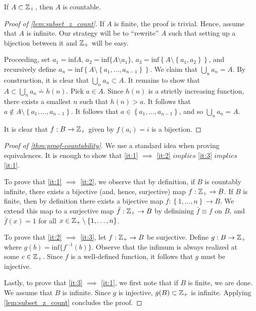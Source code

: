 \begin{lemma}\label{lem:subset_z_count}
	If $A \subset \mathbb{Z}_{+}$, then $A$ is countable.
\end{lemma}
\begin{proof}[Proof of \cref{lem:subset_z_count}]
	If $A$ is finite, the proof is trivial. Hence, assume that $A$ is infinite.
	Our strategy will be to ``rewrite'' $A$ such that setting up a bijection
	between it and $\mathbb{Z}_{+}$ will be easy.

	Proceeding, set $a_1 = \mathrm{inf} A$, $a_{2} = \mathrm{inf} \{A \setminus {a_{1}}\}$,
	$a_{3} = \mathrm{inf} \left\{ A \setminus \left\{ a_{1}, a_{2} \right\} \right\}$,
	and recursively define $a_{n} = \mathrm{inf} \left\{ A \setminus \left\{
		a_{1}, \dots,
a_{n-1} \right\}\right\}$. We claim that $\bigcup_{n} a_{n} = A$. By
construction, it is clear that $\bigcup_{n} a_{n} \subset A$. It remains to show
that $A \subset \bigcup_{n} a_{n} \doteq h(n)$. Pick $a \in A$. Since
$h(n)$ is a strictly increasing function, there exists a smallest $n$ such that
$h(n) > a$. It follows that
$a \not \in A \setminus\left\{ a_{1}, \dots, a_{n-1} \right\}$. It follows that
$a \in \left\{ a_{1}, \dots, a_{n-1} \right\}$, and so
$\bigcup_{n} a_{n} = A$. 

It is clear that $f: B \to
\mathbb{Z}_{+}$ given by $f(a_{i}) = i$ is a bijection.
	
\end{proof}

\begin{proof}[Proof of \cref{thm:proof-countability}]
	We use a standard idea when proving equivalences. It is enough to show
	that \eqref{it:1} $\implies$ \eqref{it:2} $implies$ \eqref{it:3} $implies$
	\eqref{it:1}.

	To prove that \eqref{it:1} $\implies$ \eqref{it:2}, we observe that by
	definition, if $B$ is countably infinite, there exists a bijective
	(and, hence, surjective) map  $f: \mathbb{Z}_{+} \to B$. 
	If $B$ is finite, then by definition there exists a bijective map
	$f: \left\{ 1, \dots, n \right\} \to B$. We extend this map to a surjective
	map $\bar{f}: \mathbb{Z}_{+} \to B$ by definining $\bar{f} \equiv f$ on $B$,
	and $\bar{f}(x) = 1$ for all $x \in \mathbb{Z}_{+} \setminus \left\{ 1, \dots, n
	\right\}$.

	To prove that \eqref{it:2} $\implies$ \eqref{it:3}, let
	$f:\mathbb{Z}_{+} \to B$ be surjective. Define $g: B \to \mathbb{Z}_{+}$
	where $g(b) = \mathrm{inf} \{f^{-1}(b) \}$. Observe that the infimum is always
	realized at some $c \in \mathbb{Z}_{+}$. Since $f$ is a well-defined
	function, it follows that $g$ must be injective.

	Lastly, to prove that \eqref{it:3} $\implies$ \eqref{it:1}, we first note that
	if $B$ is finite, we are done. We assume that $B$ is infinite. Since $g$ is
	injective, $g(B) \subset \mathbb{Z}_{+}$ is infinite. Applying
	\cref{lem:subset_z_count} concludes the proof.

\end{proof}

